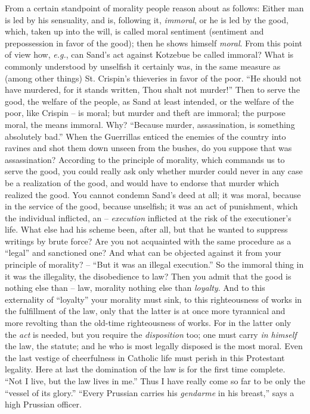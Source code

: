 From a certain standpoint of morality people reason about as follows: Either 
man is led by his sensuality, and is, following it, \textit{immoral}, or he is 
led by the good, which, taken up into the will, is called moral sentiment 
(sentiment and prepossession in favor of the good); then he shows himself 
\textit{moral}. From this point of view how, \textit{e.g.}, can Sand's act 
against Kotzebue be called immoral? What is commonly understood by unselfish 
it certainly was, in the same measure as (among other things) St. Crispin's 
thieveries in favor of the poor. ``He should not have murdered, for it stands 
written, Thou shalt not murder!'' Then to serve the good, the welfare of the 
people, as Sand at least intended, or the welfare of the poor, like Crispin -- 
is moral; but murder and theft are immoral; the purpose moral, the means 
immoral. Why? ``Because murder, assassination, is something absolutely 
bad.'' When the Guerrillas enticed the enemies of the country into ravines 
and shot them down unseen from the bushes, do you suppose that was 
assassination? According to the principle of morality, which commands us to 
serve the good, you could really ask only whether murder could never in any 
case be a realization of the good, and would have to endorse that murder which 
realized the good. You cannot condemn Sand's deed at all; it was moral, 
because in the service of the good, because unselfish; it was an act of 
punishment, which the individual inflicted, an -- \textit{execution} inflicted 
at the risk of the executioner's life. What else had his scheme been, after 
all, but that he wanted to suppress writings by brute force? Are you not 
acquainted with the same procedure as a ``legal'' and sanctioned one? And 
what can be objected against it from your principle of morality? -- ``But it 
was an illegal execution.'' So the immoral thing in it was the illegality, 
the disobedience to law? Then you admit that the good is nothing else than -- 
law, morality nothing else than \textit{loyalty}. And to this externality of 
``loyalty'' your morality must sink, to this righteousness of works in the 
fulfillment of the law, only that the latter is at once more tyrannical and 
more revolting than the old-time righteousness of works. For in the latter 
only the \textit{act} is needed, but you require the \textit{disposition} too; 
one must carry \textit{in himself} the law, the statute; and he who is most 
legally disposed is the most moral. Even the last vestige of cheerfulness in 
Catholic life must perish in this Protestant legality. Here at last the 
domination of the law is for the first time complete. ``Not I live, but the 
law lives in me.'' Thus I have really come so far to be only the ``vessel of 
its glory.'' ``Every Prussian carries his \textit{gendarme} in his 
breast,'' says a high Prussian officer.

